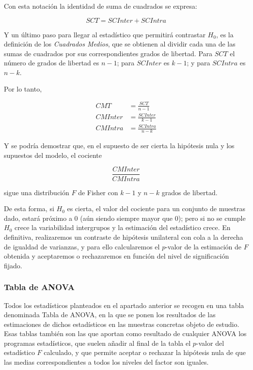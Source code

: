 \documentclass[
  a4paper,
]{scrreport}
\theoremstyle{plain}
\theoremstyle{definition}
\theoremstyle{definition}
\theoremstyle{remark}
\begin{document}
Con esta notación la identidad de suma de cuadrados se expresa:

\[
SCT = SCInter + SCIntra
\]

Y un último paso para llegar al estadístico que permitirá contrastar
\(H_0\), es la definición de los \emph{Cuadrados Medios}, que se
obtienen al dividir cada una de las sumas de cuadrados por sus
correspondientes grados de libertad. Para \(SCT\) el número de grados de
libertad es \(n-1\); para \(SCInter\) es \(k-1\); y para \(SCIntra\) es
\(n-k\).

Por lo tanto,

\begin{align*}
CMT &= \frac{SCT}{n - 1}\\
CMInter &= \frac{SCInter}{k - 1}\\
CMIntra &= \frac{SCIntra}{n -k}
\end{align*}

Y se podría demostrar que, en el supuesto de ser cierta la hipótesis
nula y los supuestos del modelo, el cociente

\[
\frac{{CMInter}}{{CMIntra}}
\]

sigue una distribución \(F\) de Fisher con \(k-1\) y \(n-k\) grados de
libertad.

De esta forma, si \(H_0\) es cierta, el valor del cociente para un
conjunto de muestras dado, estará próximo a 0 (aún siendo siempre mayor
que 0); pero si no se cumple \(H_0\) crece la variabilidad intergrupos y
la estimación del estadístico crece. En definitiva, realizaremos un
contraste de hipótesis unilateral con cola a la derecha de igualdad de
varianzas, y para ello calcularemos el \(p\)-valor de la estimación de
\(F\) obtenida y aceptaremos o rechazaremos en función del nivel de
significación fijado.

\subsubsection{Tabla de ANOVA}\label{tabla-de-anova}

Todos los estadísticos planteados en el apartado anterior se recogen en
una tabla denominada Tabla de ANOVA, en la que se ponen los resultados
de las estimaciones de dichos estadísticos en las muestras concretas
objeto de estudio. Esas tablas también son las que aportan como
resultado de cualquier ANOVA los programas estadísticos, que suelen
añadir al final de la tabla el \(p\)-valor del estadístico \(F\)
calculado, y que permite aceptar o rechazar la hipótesis nula de que las
medias correspondientes a todos los niveles del factor son iguales.
\end{document}
